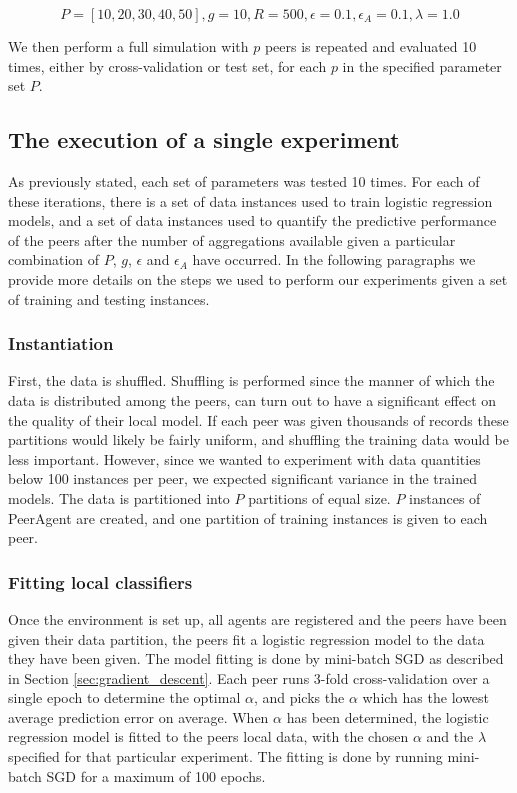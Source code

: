 $$P=[10, 20, 30, 40, 50], g=10, R=500, \epsilon=0.1, \epsilon_{A}=0.1, \lambda=1.0$$

We then perform a full simulation with $p$ peers is repeated and evaluated 10 times, either by cross-validation or test set, for each $p$ in the specified parameter set $P$. 

\subsection{The execution of a single experiment}

As previously stated, each set of parameters was tested 10 times. For each of these iterations, there is a set of data instances used to train logistic regression models, and a set of data instances used to quantify the predictive performance of the peers after the number of aggregations available given a particular combination of $P$, $g$, $\epsilon$ and $\epsilon_A$ have occurred. In the following paragraphs we provide more details on the steps we used to perform our experiments given a set of training and testing instances.

\subsubsection{Instantiation}


First, the data is shuffled. Shuffling is performed since the manner of which the data is distributed among the peers, can turn out to have a significant effect on the quality of their local model. If each peer was given thousands of records these partitions would likely be fairly uniform, and shuffling the training data would be less important. However, since we wanted to experiment with data quantities below 100 instances per peer, we expected significant variance in the trained models. The data is partitioned into $P$ partitions of equal size. $P$ instances of PeerAgent are created, and one partition of training instances is given to each peer.

\subsubsection{Fitting local classifiers}

Once the environment is set up, all agents are registered and the peers have been given their data partition, the peers fit a logistic regression model to the data they have been given. The model fitting is done by mini-batch SGD as described in Section \ref{sec:gradient_descent}. Each peer runs 3-fold cross-validation over a single epoch to determine the optimal $\alpha$, and picks the $\alpha$ which has the lowest average prediction error on average. When $\alpha$ has been determined, the logistic regression model is fitted to the peers local data, with the chosen $\alpha$ and the $\lambda$ specified for that particular experiment. The fitting is done by running mini-batch SGD for a maximum of 100 epochs.

